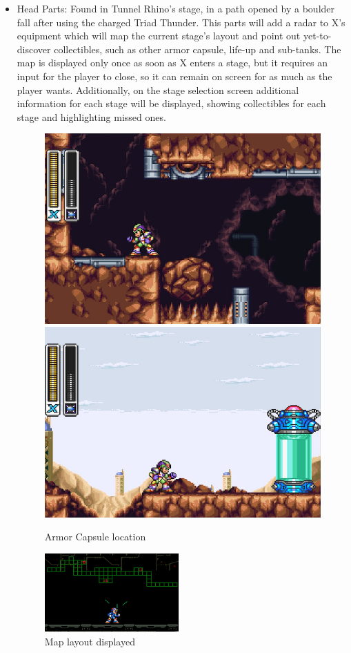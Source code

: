 \begin{itemize}
	\item Head Parts: Found in Tunnel Rhino's stage, in a path opened by a boulder fall after using the charged Triad Thunder. This parts will add a radar to X's equipment which will map the current stage's layout and point out yet-to-discover collectibles, such as other armor capsule, life-up and sub-tanks. The map is displayed only once as soon as X enters a stage, but it requires an input for the player to close, so it can remain on screen for as much as the player wants. Additionally, on the stage selection screen additional information for each stage will be displayed, showing collectibles for each stage and highlighting missed ones.
	
	\begin{figure}[htp]
		\centering
		\includegraphics[width=.45\linewidth]{figures/X3/Tunnel_rhino/Armor_1.png}
		\includegraphics[width=.45\linewidth]{figures/X3/Tunnel_rhino/Armor_2.png}
		\caption{Armor Capsule location}
	\end{figure}
	
	\begin{figure}[htp]
		\centering
		\includegraphics[height=3cm]{figures/X3/Blast_hornet/map.png}
		\caption{Map layout displayed}
	\end{figure}
	
\end{itemize}

